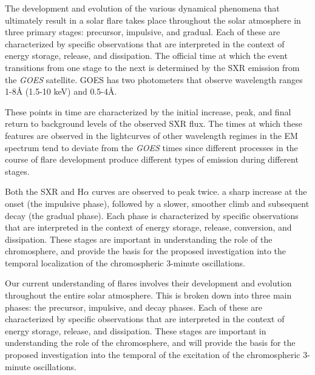 The development and evolution
of the various dynamical phenomena that ultimately
result in a solar flare
takes place throughout the solar atmosphere
in three primary stages:
precursor, impulsive, and gradual.
Each of these are characterized by specific observations that are interpreted
in the context of energy storage, release, and dissipation.
The official time at which the event transitions from one stage to the next
is determined by the SXR emission from the \textit{GOES} satellite.
GOES has two photometers that observe wavelength ranges
1-8\AA{} (1.5-10 keV) and 0.5-4\AA{}.


These points in time are
characterized by the initial increase, peak, and final return
to background levels of the observed SXR flux.
The times at which these features are observed in the
lightcurves of other wavelength regimes in the EM spectrum
tend to deviate from the \textit{GOES} times
since different processes in the course of flare development
produce different types of emission during different stages.

Both the SXR and H$\alpha$ curves are observed to peak twice.
a sharp increase at the onset (the impulsive phase),
followed by a slower, smoother climb and subsequent decay (the gradual phase).
Each phase is characterized by specific observations that are interpreted in
the context of energy storage, release, conversion, and dissipation. These
stages are important in understanding the role of the chromosphere, and provide
the basis for the proposed investigation into the temporal localization of the
chromospheric 3-minute oscillations.

Our current understanding of flares involves their development and evolution
throughout the entire solar atmosphere. This is broken down into three main
phases: the precursor, impulsive, and decay phases. Each of these are
characterized by specific observations that are interpreted in the context of
energy storage, release, and dissipation. These stages are important in
understanding the role of the chromosphere, and will provide the basis for the
proposed investigation into the temporal of the excitation of the chromospheric
3-minute oscillations.

